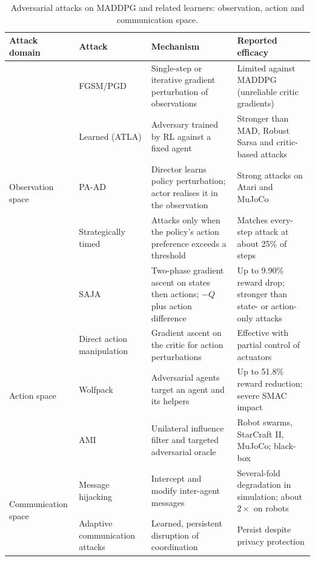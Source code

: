 \begin{table}[htbp]
\centering
\caption{Adversarial attacks on MADDPG and related learners: observation, action and
         communication space.}
\label{tab:maddpg_attacks}
\begin{tabular}{|p{2.5cm}|p{3cm}|p{4cm}|p{3.5cm}|}
\hline
\textbf{Attack domain} & \textbf{Attack} & \textbf{Mechanism} & \textbf{Reported efficacy} \\
\hline
\multirow{5}{2.5cm}{Observation space} & FGSM/PGD & Single-step or iterative gradient perturbation of observations & Limited against MADDPG (unreliable critic gradients) \\
\cline{2-4}
 & Learned (ATLA) & Adversary trained by RL against a fixed agent & Stronger than MAD, Robust Sarsa and critic-based attacks \\
\cline{2-4}
 & PA-AD & Director learns policy perturbation; actor realises it in the observation & Strong attacks on Atari and MuJoCo \\
\cline{2-4}
 & Strategically timed & Attacks only when the policy's action preference exceeds a threshold & Matches every-step attack at about 25\% of steps \\
\cline{2-4}
 & SAJA & Two-phase gradient ascent on states then actions; $-Q$ plus action difference & Up to 9.90\% reward drop; stronger than state- or action-only attacks \\
\hline
\multirow{3}{2.5cm}{Action space} & Direct action manipulation & Gradient ascent on the critic for action perturbations & Effective with partial control of actuators \\
\cline{2-4}
 & Wolfpack & Adversarial agents target an agent and its helpers & Up to 51.8\% reward reduction; severe SMAC impact \\
\cline{2-4}
 & AMI & Unilateral influence filter and targeted adversarial oracle & Robot swarms, StarCraft II, MuJoCo; black-box \\
\hline
\multirow{2}{2.5cm}{Communication space} & Message hijacking & Intercept and modify inter-agent messages & Several-fold degradation in simulation; about $2\times$ on robots \\
\cline{2-4}
 & Adaptive communication attacks & Learned, persistent disruption of coordination & Persist despite privacy protection \\
\hline
\end{tabular}
\end{table}

